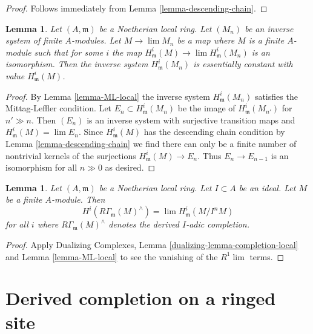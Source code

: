 \documentclass{stacks-project}
\theoremstyle{plain}
\newtheorem{lemma}[subsection]{Lemma}
\theoremstyle{definition}
\theoremstyle{remark}
\numberwithin{equation}{subsection}
\def\lim{\mathop{\mathrm{lim}}\nolimits}
\begin{document}
\begin{proof}
Follows immediately from Lemma \ref{lemma-descending-chain}.
\end{proof}

\begin{lemma}
\label{lemma-terrific}
Let $(A, \mathfrak m)$ be a Noetherian local ring.
Let $(M_n)$ be an inverse system of finite $A$-modules.
Let $M \to \lim M_n$ be a map where $M$ is a finite $A$-module
such that for some $i$ the map
$H^i_\mathfrak m(M) \to \lim H^i_\mathfrak m(M_n)$
is an isomorphism.
Then the inverse system $H^i_\mathfrak m(M_n)$
is essentially constant with value $H^i_\mathfrak m(M)$.
\end{lemma}

\begin{proof}
By Lemma \ref{lemma-ML-local} the inverse system $H^i_\mathfrak m(M_n)$
satisfies the Mittag-Leffler condition. Let $E_n \subset H^i_\mathfrak m(M_n)$
be the image of $H^i_\mathfrak m(M_{n'})$ for $n' \gg n$.
Then $(E_n)$ is an inverse system with surjective transition maps
and $H^i_\mathfrak m(M) = \lim E_n$. Since $H^i_\mathfrak m(M)$
has the descending chain condition by
Lemma \ref{lemma-descending-chain}
we find there can only be a finite number of nontrivial
kernels of the surjections $H^i_\mathfrak m(M) \to E_n$.
Thus $E_n \to E_{n - 1}$ is an isomorphism for all $n \gg 0$
as desired.
\end{proof}

\begin{lemma}
\label{lemma-local-cohomology-derived-completion}
Let $(A, \mathfrak m)$ be a Noetherian local ring.
Let $I \subset A$ be an ideal. Let $M$ be a finite $A$-module.
Then
$$
H^i(R\Gamma_\mathfrak m(M)^\wedge) = \lim H^i_\mathfrak m(M/I^nM)
$$
for all $i$ where $R\Gamma_\mathfrak m(M)^\wedge$ denotes
the derived $I$-adic completion.
\end{lemma}

\begin{proof}
Apply Dualizing Complexes, Lemma \ref{dualizing-lemma-completion-local}
and Lemma \ref{lemma-ML-local} to see the vanishing of the $R^1\lim$ terms.
\end{proof}








\section{Derived completion on a ringed site}
\label{section-derived-completion}
\end{document}

